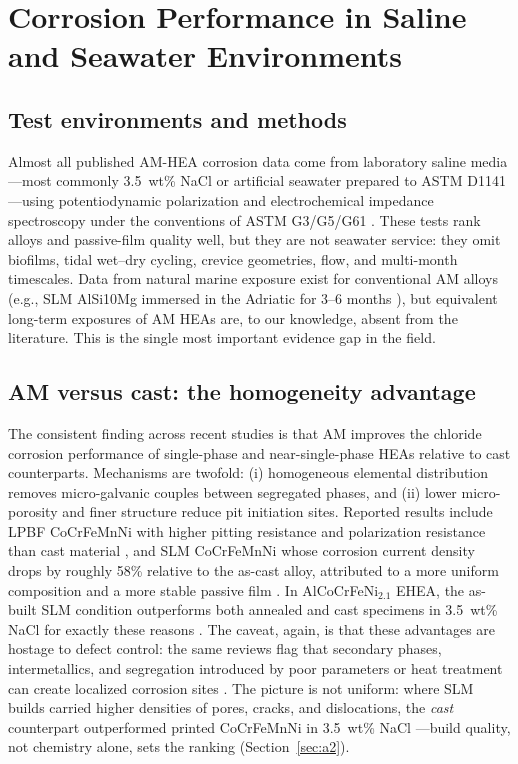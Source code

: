 \section{Corrosion Performance in Saline and Seawater Environments}
\label{sec:corrosion}

\subsection{Test environments and methods}

Almost all published AM-HEA corrosion data come from laboratory saline media---most commonly 3.5~wt\% NaCl or artificial seawater prepared to ASTM D1141 \cite{astm_d1141}---using potentiodynamic polarization and electrochemical impedance spectroscopy under the conventions of ASTM G3/G5/G61 \cite{astm_g3,astm_g5,astm_g61}. These tests rank alloys and passive-film quality well, but they are not seawater service: they omit biofilms, tidal wet--dry cycling, crevice geometries, flow, and multi-month timescales. Data from natural marine exposure exist for conventional AM alloys (e.g., SLM AlSi10Mg immersed in the Adriatic for 3--6 months \cite{am_alsi10mg_2026}), but equivalent long-term exposures of AM HEAs are, to our knowledge, absent from the literature. This is the single most important evidence gap in the field.

\subsection{AM versus cast: the homogeneity advantage}

The consistent finding across recent studies is that AM improves the chloride corrosion performance of single-phase and near-single-phase HEAs relative to cast counterparts. Mechanisms are twofold: (i) homogeneous elemental distribution removes micro-galvanic couples between segregated phases, and (ii) lower micro-porosity and finer structure reduce pit initiation sites. Reported results include LPBF CoCrFeMnNi with higher pitting resistance and polarization resistance than cast material \cite{han2025}, and SLM CoCrFeMnNi whose corrosion current density drops by roughly 58\% relative to the as-cast alloy, attributed to a more uniform composition and a more stable passive film \cite{han2025,cagirici2024}. In AlCoCrFeNi$_{2.1}$ EHEA, the as-built SLM condition outperforms both annealed and cast specimens in 3.5~wt\% NaCl for exactly these reasons \cite{slm_ehea_2025}. The caveat, again, is that these advantages are hostage to defect control: the same reviews flag that secondary phases, intermetallics, and segregation introduced by poor parameters or heat treatment can create localized corrosion sites \cite{cagirici2024}. The picture is not uniform: where SLM builds carried higher densities of pores, cracks, and dislocations, the \emph{cast} counterpart outperformed printed CoCrFeMnNi in 3.5~wt\% NaCl \cite{frontiers2020slmcast}---build quality, not chemistry alone, sets the ranking (Section~\ref{sec:a2}).

